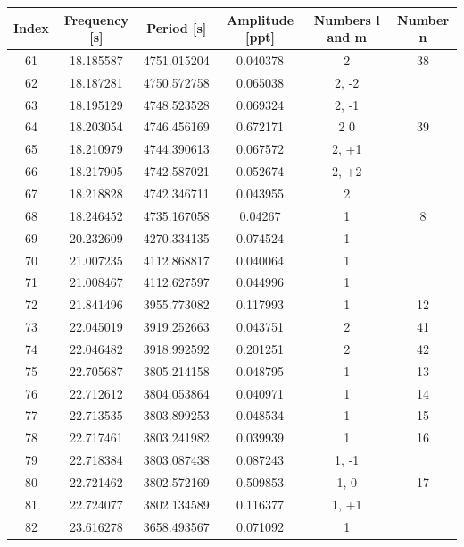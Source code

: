 \documentclass{aa}
\begin{document}
\begin{table}[]
    \centering
    \begin{tabular}{c|c|c|c|c|c}
Index & Frequency [s] & Period [s] & Amplitude [ppt] & Numbers l and m & Number n \\  
\hline 


61  &  18.185587 &  4751.015204 &  0.040378 &    2  &     38 \\
62  &  18.187281 &  4750.572758 &  0.065038 &    2, -2  &      \\
63  &  18.195129 &  4748.523528 &  0.069324 &    2, -1  &      \\
64  &  18.203054 &  4746.456169 &  0.672171 &    2 0 &     39   \\
65  &  18.210979 &  4744.390613 &  0.067572 &    2, +1  &         \\
66  &  18.217905 &  4742.587021 &  0.052674 &    2, +2  &         \\
67  &  18.218828 &  4742.346711 &  0.043955 &    2  &         \\
68 &  18.246452 &  4735.167058 &   0.04267 &    1  &     8 \\
69 &  20.232609 &  4270.334135 &  0.074524 &    1  &         \\
70 &  21.007235 &  4112.868817 &  0.040064 &    1  &         \\
71 &  21.008467 &  4112.627597 &  0.044996 &    1  &         \\
72 &  21.841496 &  3955.773082 &  0.117993 &    1  &     12 \\
73 &  22.045019 &  3919.252663 &  0.043751 &    2  &     41 \\
74 &  22.046482 &  3918.992592 &  0.201251 &    2  &     42 \\
75 &  22.705687 &  3805.214158 &  0.048795 &    1  &     13 \\
76 &  22.712612 &  3804.053864 &  0.040971 &    1  &     14 \\
77 &  22.713535 &  3803.899253 &  0.048534 &    1  &     15 \\
78 &  22.717461 &  3803.241982 &  0.039939 &    1  &     16 \\
79 &  22.718384 &  3803.087438 &  0.087243 &    1, -1  &      \\
80 &  22.721462 &  3802.572169 &  0.509853 &    1, 0  &      17   \\
81 &  22.724077 &  3802.134589 &  0.116377 &    1, +1  &         \\
82 &  23.616278 &  3658.493567 &  0.071092 &    1  &         \\

\end{tabular}
\end{table}
\end{document}
